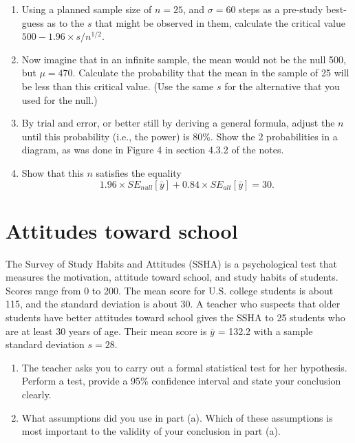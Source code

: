 \documentclass[letterpaper,9pt,twoside,printwatermark=false]{pinp}
\providecommand{\tightlist}{%
  \setlength{\itemsep}{0pt}\setlength{\parskip}{0pt}}
\begin{document}
\begin{enumerate}
\item
Using a planned sample size of $n=25$, and $\sigma = 60$ steps as a pre-study best-guess as to the  $s$ that might  be observed in them, calculate the critical value  $500 - 1.96\times  s/n^{1/2}$.
\item
Now imagine that in an infinite sample,  the mean would not be the null 500, but $\mu=470.$
Calculate the probability that the mean in the sample of 25  will be less than this critical value. (Use the same $s$ for the alternative that you used for the null.)
\item
By trial and error, or better still by deriving a general formula, adjust the $n$ until this probability (i.e., the power) is 80\%. Show the 2 probabilities in a diagram, as was done in Figure 4 in section 4.3.2 of the notes.
\item Show that this $n$ satisfies the equality $$1.96\times SE_{null}[\bar{y}] + 0.84 \times SE_{alt}[\bar{y}] = 30.$$

\end{enumerate}

\newpage

\section{Attitudes toward school}\label{attitudes-toward-school}

The Survey of Study Habits and Attitudes (SSHA) is a psychological test
that measures the motivation, attitude toward school, and study habits
of students. Scores range from 0 to 200. The mean score for U.S. college
students is about 115, and the standard deviation is about 30. A teacher
who suspects that older students have better attitudes toward school
gives the SSHA to 25 students who are at least 30 years of age. Their
mean score is \(\bar{y}\) = 132.2 with a sample standard deviation
\(s = 28\).

\begin{enumerate}
\def\labelenumi{\alph{enumi}.}
\tightlist
\item
  The teacher asks you to carry out a formal statistical test for her
  hypothesis. Perform a test, provide a 95\% confidence interval and
  state your conclusion clearly.
\item
  What assumptions did you use in part (a). Which of these assumptions
  is most important to the validity of your conclusion in part (a).
\end{enumerate}
\end{document}
